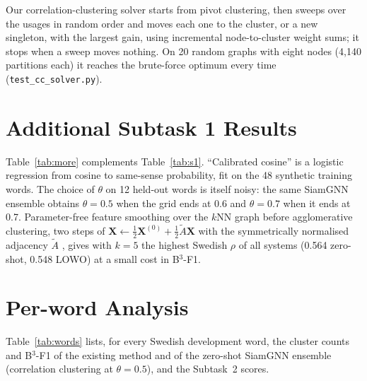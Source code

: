 \documentclass[11pt]{article}
\newcommand{\sys}{SiamGNN\xspace}
\newcommand{\bcubed}{B$^3$-F1\xspace}
\begin{document}
Our correlation-clustering solver starts from pivot clustering, then sweeps over the usages in random order and moves each one to the cluster, or a new singleton, with the largest gain, using incremental node-to-cluster weight sums; it stops when a sweep moves nothing. On 20 random graphs with eight nodes (4,140 partitions each) it reaches the brute-force optimum every time (\texttt{test\_cc\_solver.py}).

\section{Additional Subtask 1 Results}
\label{app:more}

Table~\ref{tab:more} complements Table~\ref{tab:s1}. ``Calibrated cosine'' is a logistic regression from cosine to same-sense probability, fit on the 48 synthetic training words. The choice of $\theta$ on 12 held-out words is itself noisy: the same \sys ensemble obtains $\theta=0.5$ when the grid ends at 0.6 and $\theta=0.7$ when it ends at 0.7. Parameter-free feature smoothing over the $k$NN graph before agglomerative clustering, two steps of $\mathbf{X}\leftarrow\frac{1}{2}\mathbf{X}^{(0)}+\frac{1}{2}\tilde{A}\mathbf{X}$ with the symmetrically normalised adjacency $\tilde{A}$ \citep{wu2019simplifying,gasteiger2019predict}, gives with $k=5$ the highest Swedish $\rho$ of all systems (0.564 zero-shot, 0.548 LOWO) at a small cost in \bcubed.

\begin{table}[t]
\centering
\small

\caption{Additional Subtask~1 configurations (official scorer, zero-shot protocol unless marked LOWO).}
\label{tab:more}
\end{table}

\section{Per-word Analysis}
\label{app:words}

Table~\ref{tab:words} lists, for every Swedish development word, the cluster counts and \bcubed of the existing method and of the zero-shot \sys ensemble (correlation clustering at $\theta=0.5$), and the Subtask~2 scores.

\begin{table}[t]
\centering
\small
\setlength{\tabcolsep}{4.2pt}

\caption{Swedish development words. Era: usages from 1880--1915 (early), 2006--2023 (late) or both. Exist.\ = existing method; Proto.\ = prototype refinement; Pos.\ = share of usages that express the Subtask~2 target sense.}
\label{tab:words}
\end{table}
\end{document}
